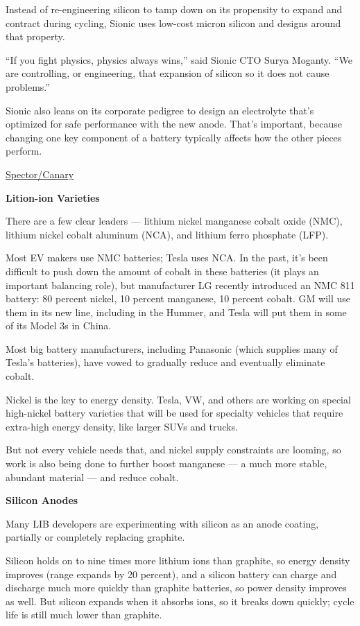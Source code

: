 \documentclass[
]{book}
\begin{document}
Instead of re-engineering silicon to tamp down on its propensity to expand and contract during cycling, Sionic uses low-cost micron silicon and designs around that property.

``If you fight physics, physics always wins,'' said Sionic CTO Surya Moganty. ``We are controlling, or engineering, that expansion of silicon so it does not cause problems.''

Sionic also leans on its corporate pedigree to design an electrolyte that's optimized for safe performance with the new anode. That's important, because changing one key component of a battery typically affects how the other pieces perform.

\href{https://www.canarymedia.com/articles/startup-sionic-promises-next-gen-battery-benefits-without-the-wait/}{Spector/Canary}

\textbf{Lition-ion Varieties}

There are a few clear leaders --- lithium nickel manganese cobalt oxide (NMC), lithium nickel cobalt aluminum (NCA), and lithium ferro phosphate (LFP).

Most EV makers use NMC batteries; Tesla uses NCA. In the past, it's been difficult to push down the amount of cobalt in these batteries (it plays an important balancing role), but manufacturer LG recently introduced an NMC 811 battery: 80 percent nickel, 10 percent manganese, 10 percent cobalt. GM will use them in its new line, including in the Hummer, and Tesla will put them in some of its Model 3s in China.

Most big battery manufacturers, including Panasonic (which supplies many of Tesla's batteries), have vowed to gradually reduce and eventually eliminate cobalt.

Nickel is the key to energy density. Tesla, VW, and others are working on special high-nickel battery varieties that will be used for specialty vehicles that require extra-high energy density, like larger SUVs and trucks.

But not every vehicle needs that, and nickel supply constraints are looming, so work is also being done to further boost manganese --- a much more stable, abundant material --- and reduce cobalt.

\textbf{Silicon Anodes}

Many LIB developers are experimenting with silicon as an anode coating, partially or completely replacing graphite.

Silicon holds on to nine times more lithium ions than graphite, so energy density improves (range expands by 20 percent), and a silicon battery can charge and discharge much more quickly than graphite batteries, so power density improves as well. But silicon expands when it absorbs ions, so it breaks down quickly; cycle life is still much lower than graphite.
\end{document}
